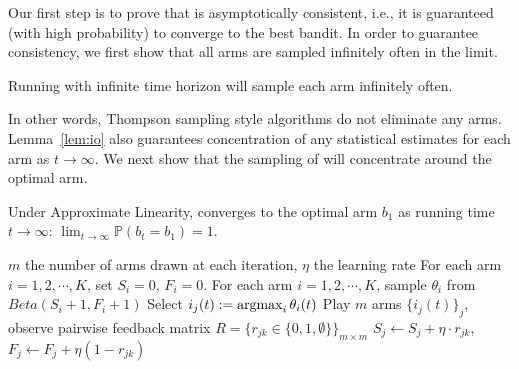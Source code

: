 
Our first step is to prove that \multisparring is asymptotically consistent, i.e., it is guaranteed (with high probability) to converge to the best bandit.  In order to guarantee consistency, we first show that all arms are sampled infinitely often in the limit.

\begin{lemma}
\label{lem:io}
Running \multisparring with infinite time horizon will sample each arm infinitely often.
\end{lemma}

In other words, Thompson sampling style algorithms do not eliminate any arms. 
Lemma~\ref{lem:io} also guarantees concentration of any statistical estimates for each arm as $t\rightarrow \infty$.
We next show that the sampling of \multisparring will concentrate around the optimal arm.  

\begin{theorem}
\label{thm:conv}
Under Approximate Linearity, \multisparring converges to the optimal arm $b_1$ as running time $t\rightarrow \infty$: $\lim_{t\rightarrow \infty} \mathbb{P}(b_t = b_1) = 1$.
\end{theorem}


\begin{algorithm}[tb]
     \caption{\multisparring}
     \label{alg:ms}
 \begin{algorithmic}[1]
 	 \INPUT $m$ the number of arms drawn at each iteration, $\eta$ the learning rate
     \STATE For each arm $i=1,2,\cdots, K$, set $S_i=0$, $F_i=0$.
          \STATE For each arm $i=1,2,\cdots, K$, sample $\theta_{i}$ from $Beta(S_i+1,F_i+1)$
          \STATE Select $i_j(t) := \argmax_i{\theta_i(t)}$
    	\ENDFOR
        \STATE Play $m$ arms $\{i_j(t)\}_j$, observe pairwise feedback matrix $R = \{r_{jk} \in \{0,1,\emptyset\}\}_{m \times m}$
          \STATE $S_j \leftarrow S_j + \eta\cdot r_{jk}$, 
          $F_j \leftarrow F_j + \eta(1 - r_{jk})$
          \ENDIF
        \ENDFOR
     \ENDFOR
 \end{algorithmic}
 \end{algorithm}
 
